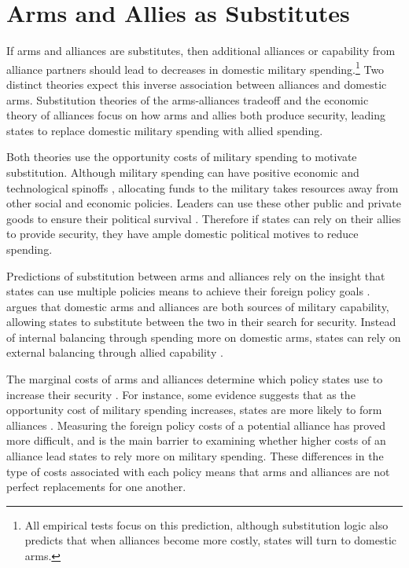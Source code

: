 \documentclass[12pt]{article}
\begin{document}
\section*{Arms and Allies as Substitutes}

If arms and alliances are substitutes, then additional alliances or capability from alliance partners should lead to decreases in domestic military spending.\footnote{All empirical tests focus on this prediction, although substitution logic also predicts that when alliances become more costly, states will turn to domestic arms.} Two distinct theories expect this inverse association between alliances and domestic arms. Substitution theories of the arms-alliances tradeoff and the economic theory of alliances focus on how arms and allies both produce security, leading states to replace domestic military spending with allied spending. 

Both theories use the opportunity costs of military spending to motivate substitution. Although military spending can have positive economic and technological spinoffs \citep{DegerSen1995, WhittenWilliams2011}, allocating funds to the military takes resources away from other social and economic policies. Leaders can use these other public and private goods to ensure their political survival \citep{BDMetal2002}. Therefore if states can rely on their allies to provide security, they have ample domestic political motives to reduce spending. 

Predictions of substitution between arms and alliances rely on the insight that states can use multiple policies means to achieve their foreign policy goals \citep{MostStarr1989}. \citet{Morrow1993} argues that domestic arms and alliances are both sources of military capability, allowing states to substitute between the two in their search for security. Instead of internal balancing through spending more on domestic arms, states can rely on external balancing through allied capability \citep{Conybeare1992}. 

The marginal costs of arms and alliances determine which policy states use to increase their security \citep{Sorokin1994}. For instance, some evidence suggests that as the opportunity cost of military spending increases, states are more likely to form alliances \citep{Kimball2010, AllenDigiuseppe2013}. Measuring the foreign policy costs of a potential alliance has proved more difficult, and is the main barrier to examining whether higher costs of an alliance lead states to rely more on military spending. These differences in the type of costs associated with each policy means that arms and alliances are not perfect replacements for one another. 
\end{document}
